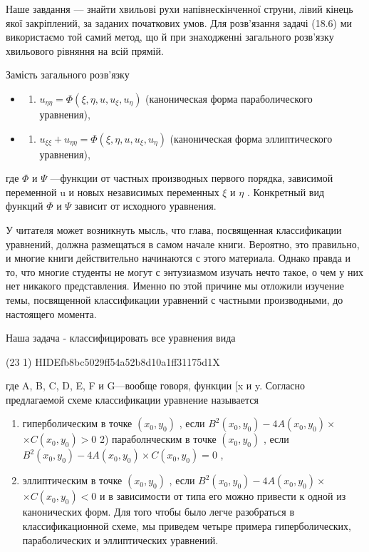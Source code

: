 \documentclass[
  ukrainian,
]{article}
\providecommand{\tightlist}{%
  \setlength{\itemsep}{0pt}\setlength{\parskip}{0pt}}
\begin{document}
Наше завдання --- знайти хвильові рухи напівнескінченної струни, лівий
кінець якої закріплений, за заданих початкових умов. Для розв'язання
задачі (18.6) ми використаємо той самий метод, що й при знаходженні
загального розв'язку хвильового рівняння на всій прямій.

Замість загального розв'язку

\begin{itemize}
\tightlist
\item
  \begin{enumerate}
  \def\labelenumi{\arabic{enumi}.}
  \setcounter{enumi}{1}
  \tightlist
  \item
    \(u_{\eta\eta} = \Phi(\xi, \eta, u, u_{\xi}, u_{\eta})\)
    (каноническая форма параболического уравнения),
  \end{enumerate}
\item
  \begin{enumerate}
  \def\labelenumi{\arabic{enumi}.}
  \setcounter{enumi}{2}
  \tightlist
  \item
    \(u_{\xi\xi} + u_{\eta\eta} = \Phi(\xi, \eta, u, u_{\xi}, u_{\eta})\)
    (каноническая форма эллиптического уравнения),
  \end{enumerate}
\end{itemize}

где \(\Phi\) и \(\Psi\) ---функции от частных производных первого
порядка, зависимой переменной u и новых независимых переменных \(\xi\) и
\(\eta\) . Конкретный вид функций \(\Phi\) и \(\Psi\) зависит от
исходного уравнения.

У читателя может возникнуть мысль, что глава, посвященная классификации
уравнений, должна размещаться в самом начале книги. Вероятно, это
правильно, и многие книги действительно начинаются с этого материала.
Однако правда и то, что многие студенты не могут с энтузиазмом изучать
нечто такое, о чем у них нет никакого представления. Именно по этой
причине мы отложили изучение темы, посвященной классификации уравнений с
частными производными, до настоящего момента.

Наша задача - классифицировать все уравнения вида

(23 1) HIDEfb8bc5029ff54a52b8d10a1ff31175d1X

где A, B, C, D, E, F и G---вообще говоря, функции {[}x и y. Согласно
предлагаемой схеме классификации уравнение называется

\begin{enumerate}
\def\labelenumi{\arabic{enumi})}
\item
  гиперболическим в точке \((x_0, y_0)\) , если
  \(B^2(x_0, y_0) - 4A(x_0, y_0) \times\) \(\times C(x_0, y_0) > 0\) 2)
  параболнческим в точке \((x_0, y_0)\) , если
  \(B^2(x_0, y_0) - 4A(x_0, y_0) \times C(x_0, y_0) = 0\) ,
\item
  эллиптическим в точке \((x_0, y_0)\) , если
  \(B^2(x_0, y_0) - 4A(x_0, y_0) \times\) \(\times C(x_0, y_0) < 0\) и в
  зависимости от типа его можно привести к одной из канонических форм.
  Для того чтобы было легче разобраться в классификационной схеме, мы
  приведем четыре примера гиперболических, параболических и
  эллиптических уравнений.
\end{enumerate}
\end{document}
